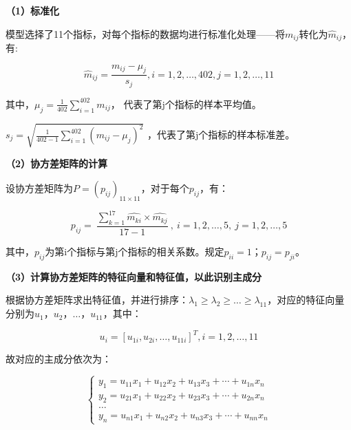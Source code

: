\documentclass[withoutpreface,bwprint]{cumcmthesis} %
\begin{document}
\begin{spacing}{1.8}\textbf{（1）标准化}\end{spacing}
模型选择了11个指标，对每个指标的数据均进行标准化处理——将$m_{ij}$转化为${\hat{m}_{ij}}$，有:

\begin{equation}
    \widehat{m}_{i j}=\frac{m_{i j}-\mu_{j}}{s_{j}}, i=1,2, \ldots, 402, j=1,2, \ldots, 11
\end{equation}

其中，$\mu_{j}=\frac{1}{402} \sum_{i=1}^{402} m_{i j}$， 代表了第j个指标的样本平均值。

$s_{j}=\sqrt{\frac{1}{402-1} \sum_{i=1}^{402}\left(m_{i j}-\mu_{j}\right)^{2}}$ ，代表了第j个指标的样本标准差。

\begin{spacing}{1.8}\textbf{（2）协方差矩阵的计算}\end{spacing}

设协方差矩阵为$P={(p_{ij})}_{11\times11} $，对于每个$p_{ij}$，有：

\begin{equation}
    p_{ij}=\ \frac{\sum_{k=1}^{17}{\widehat{m_{ki}}\times\widehat{m_{kj}}}}{17-1}\ ,\ i=1,2,\ldots,5,\ j=1,2,\ldots,5
\end{equation}

其中，$p_{ij}$为第i个指标与第j个指标的相关系数。规定$p_{ii}=1$；$p_{ij}=p_{ji}$。

\begin{spacing}{1.8}\textbf{（3）计算协方差矩阵的特征向量和特征值，以此识别主成分}\end{spacing}
根据协方差矩阵求出特征值，并进行排序：$\lambda_1\geq\lambda_2{\geq\ldots\geq\lambda}_{11}$，对应的特征向量分别为$u_1\text{，}u_2\text{，}…\text{，}u_{11}$，其中：

\begin{equation}
    u_{i}=\left[u_{1 i}, u_{2 i}, \ldots, u_{11 i}\right]^{T}, i=1,2, \ldots, 11
\end{equation}

故对应的主成分依次为：

\begin{equation}
    \left\{\begin{array}{l}
        y_{1}=u_{11} x_{1}+u_{12} x_{2}+u_{13} x_{3}+\cdots+u_{1 n} x_{n} \\
        y_{2}=u_{21} x_{1}+u_{22} x_{2}+u_{23} x_{3}+\cdots+u_{2 n} x_{n} \\
        \ldots \\
        y_{n}=u_{n 1} x_{1}+u_{n 2} x_{2}+u_{n 3} x_{3}+\cdots+u_{n n} x_{n}
        \end{array}
    \right.
\end{equation}
\end{document}

